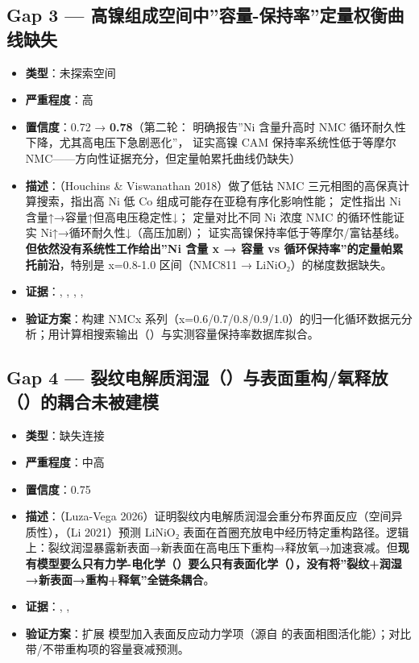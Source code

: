 \documentclass[12pt,a4paper]{ctexart}
\providecommand{\tightlist}{%
  \setlength{\itemsep}{0pt}\setlength{\parskip}{0pt}}
\begin{document}
\subsection{Gap 3 --- 高镍组成空间中''容量-保持率''定量权衡曲线缺失}\label{gap:gap-3-ux9ad8ux954dux7ec4ux6210ux7a7aux95f4ux4e2dux5bb9ux91cf-ux4fddux6301ux7387ux5b9aux91cfux6743ux8861ux66f2ux7ebfux7f3aux5931}

\begin{itemize}
\tightlist
\item
  \textbf{类型}：未探索空间
\item
  \textbf{严重程度}：高
\item
  \textbf{置信度}：0.72 → \textbf{0.78}（第二轮：\cite{p47} 明确报告''Ni 含量升高时 NMC 循环耐久性下降，尤其高电压下急剧恶化''，\cite{p45} 证实高镍 CAM 保持率系统性低于等摩尔 NMC------方向性证据充分，但定量帕累托曲线仍缺失）
\item
  \textbf{描述}：\cite{p22}（Houchins \& Viswanathan 2018）做了低钴 NMC 三元相图的高保真计算搜索，指出高 Ni 低 Co 组成可能存在亚稳有序化影响性能；\cite{p24} 定性指出 Ni 含量↑→容量↑但高电压稳定性↓；\cite{p47} 定量对比不同 Ni 浓度 NMC 的循环性能证实 Ni↑→循环耐久性↓（高压加剧）；\cite{p45} 证实高镍保持率低于等摩尔/富钴基线。\textbf{但依然没有系统性工作给出''Ni 含量 x → 容量 vs 循环保持率''的定量帕累托前沿}，特别是 x=0.8-1.0 区间（NMC811 → LiNiO₂）的梯度数据缺失。
\item
  \textbf{证据}：\cite{p22}, \cite{p24}, \cite{p32}, \cite{p47}, \cite{p45}
\item
  \textbf{验证方案}：构建 NMCx 系列（x=0.6/0.7/0.8/0.9/1.0）的归一化循环数据元分析；用计算相搜索输出（\cite{p22}）与实测容量保持率数据库拟合。
\end{itemize}

\subsection{Gap 4 --- 裂纹电解质润湿（\cite{p31}）与表面重构/氧释放（\cite{p32}）的耦合未被建模}\label{gap:gap-4-ux88c2ux7eb9ux7535ux89e3ux8d28ux6da6ux6e7fp31ux4e0eux8868ux9762ux91cdux6784ux6c27ux91caux653ep32ux7684ux8026ux5408ux672aux88abux5efaux6a21}

\begin{itemize}
\tightlist
\item
  \textbf{类型}：缺失连接
\item
  \textbf{严重程度}：中高
\item
  \textbf{置信度}：0.75
\item
  \textbf{描述}：\cite{p31}（Luza-Vega 2026）证明裂纹内电解质润湿会重分布界面反应（空间异质性），\cite{p32}（Li 2021）预测 LiNiO₂ 表面在首圈充放电中经历特定重构路径。逻辑上：裂纹润湿暴露新表面→新表面在高电压下重构→释放氧→加速衰减。但\textbf{现有模型要么只有力学-电化学（\cite{p31}）要么只有表面化学（\cite{p32}），没有将''裂纹+润湿→新表面→重构+释氧''全链条耦合}。
\item
  \textbf{证据}：\cite{p31}, \cite{p32}, \cite{p27}
\item
  \textbf{验证方案}：扩展 \cite{p31} 模型加入表面反应动力学项（源自 \cite{p32} 的表面相图活化能）；对比带/不带重构项的容量衰减预测。
\end{itemize}
\end{document}
